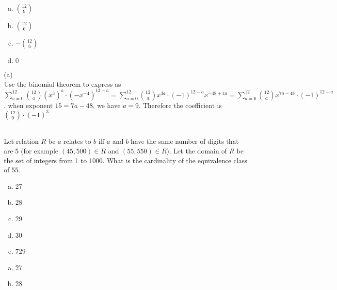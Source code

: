 \begin{solution}
\begin{enumerate}[(a)]
	\item  $\binom{12}{9}$
    
	\item  $\binom{12}{6}$
    
	\item  $-\binom{12}{6}$
    
	\item  $0$

\end{enumerate}
\begin{solution}

(a)\\
Use the binomial theorem to express as\\  $\sum_{a=0}^{12}\binom {12}a(x^3)^a \cdot (-x^{-4})^{12-a}=\sum_{a=0}^{12}\binom {12}ax^{3a} \cdot (-1)^{12-a}x^{-48+4a}=\sum_{a=0}^{12}\binom {12}ax^{7a-48} \cdot (-1)^{12-a}$. when exponent $15 = 7a - 48$, we have $a = 9$. Therefore the coefficient is $\binom{12}{9} \cdot (-1)^3$

\end{solution}
\\
Let relation $R$ be $a$ relates to $b$ iff $a$ and $b$ have the same number of digits that are 5 (for example $(45, 500)\in R$ and $(55, 550)\in R$).  Let the domain of $R$ be the set of integers from 1 to 1000. What is the cardinality of the equivalence class of 55.
\begin{enumerate}[a)]
    \item 27
    \item 28
    \item 29
    \item 30
    \item 729
\end{enumerate}

\begin{enumerate}[(a)]
	\item  27
    
	\item  28
    

\end{enumerate}
\end{solution}
